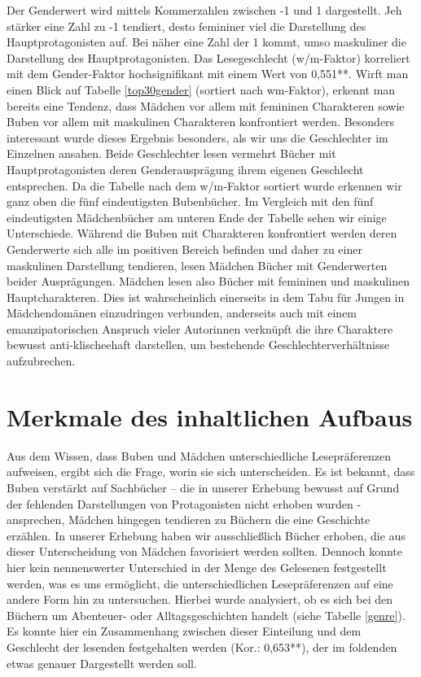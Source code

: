 Der Genderwert wird mittels Kommerzahlen zwischen -1 und 1 dargestellt.
Jeh stärker eine Zahl zu -1 tendiert, desto femininer viel die
Darstellung des Hauptprotagonisten auf. Bei näher eine Zahl der 1 kommt,
umso maskuliner die Darstellung des Hauptprotagonisten. Das
Lesegeschlecht (w/m-Faktor) korreliert mit dem Gender-Faktor
hochsignifikant mit einem Wert von 0,551**. Wirft man einen Blick auf
Tabelle \ref{top30gender} (sortiert nach wm-Faktor), erkennt man bereits
eine Tendenz, dass Mädchen vor allem mit femininen Charakteren sowie
Buben vor allem mit maskulinen Charakteren konfrontiert werden.
Besonders interessant wurde dieses Ergebnis besonders, als wir uns die
Geschlechter im Einzelnen ansahen. Beide Geschlechter lesen vermehrt
Bücher mit Hauptprotagonisten deren Genderausprägung ihrem eigenen
Geschlecht entsprechen. Da die Tabelle nach dem w/m-Faktor sortiert
wurde erkennen wir ganz oben die fünf eindeutigsten Bubenbücher. Im
Vergleich mit den fünf eindeutigsten Mädchenbücher am unteren Ende der
Tabelle sehen wir einige Unterschiede. Während die Buben mit Charakteren
konfrontiert werden deren Genderwerte sich alle im positiven Bereich
befinden und daher zu einer maskulinen Darstellung tendieren, lesen
Mädchen Bücher mit Genderwerten beider Ausprägungen. Mädchen lesen also
Bücher mit femininen und maskulinen Hauptcharakteren. Dies ist
wahrscheinlich einerseits in dem Tabu für Jungen in Mädchendomänen
einzudringen verbunden, anderseits auch mit einem emanzipatorischen
Anspruch vieler Autorinnen verknüpft die ihre Charaktere bewusst
anti-klischeehaft darstellen, um bestehende Geschlechterverhältnisse
aufzubrechen.



\section{Merkmale des inhaltlichen Aufbaus}

Aus dem Wissen, dass Buben und Mädchen unterschiedliche Lesepräferenzen
aufweisen, ergibt sich die Frage, worin sie sich unterscheiden. Es ist
bekannt, dass Buben verstärkt auf Sachbücher -- die in unserer Erhebung
bewusst auf Grund der fehlenden Darstellungen von Protagonisten nicht
erhoben wurden - ansprechen, Mädchen hingegen tendieren zu Büchern die
eine Geschichte erzählen. In unserer Erhebung haben wir ausschließlich
Bücher erhoben, die aus dieser Unterscheidung von Mädchen favorisiert
werden sollten. Dennoch konnte hier kein nennenswerter Unterschied in
der Menge des Gelesenen festgestellt werden, was es uns ermöglicht, die
unterschiedlichen Lesepräferenzen auf eine andere Form hin zu
untersuchen. Hierbei wurde analysiert, ob es sich bei den Büchern um
Abenteuer- oder Alltagsgeschichten handelt (siehe Tabelle \ref{genre}).
Es konnte hier ein Zusammenhang zwischen dieser Einteilung und dem
Geschlecht der lesenden festgehalten werden (Kor.: 0,653**), der im
foldenden etwas genauer Dargestellt werden soll.

